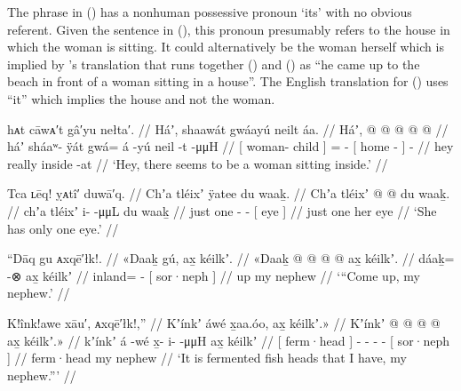 The phrase  in (\lastx) has a nonhuman possessive pronoun  ‘its’ with no obvious referent.
Given the sentence in (\nextx), this pronoun presumably refers to the house in which the woman is sitting.
It could alternatively be the woman herself which is implied by \citeauthor{swanton:1909}’s translation that runs together (\lastx) and (\nextx) as “he came up to the beach in front of a woman sitting in a house”.
The English translation for (\lastx) uses “it” which implies the house and not the woman.

\ex\label{ex:91-250-woman-sitting-inside}%
%
\begingl
	\glpreamble	hᴀt cāwᴀ′t gâ′yu nełta′. //
	\glpreamble	Háʼ, shaawát gwáayú neilt áa. //
	\gla	Háʼ, {}  @ {} {}  @ {} @ {}
		{}  @ {} {}  @ {} //
	\glb	háʼ {} sháaʷ- ÿát {} gwá= á -yú
		{} neil -t {}  -μμH //
	\glc	{} {}[ woman- child {}] =  -
		{}[ home - {}]  - //
	\gld	hey {}  {} {} really\•  {}
		{} inside -at {}  {} //
	\glft	‘Hey, there seems to be a woman sitting inside.’
		//
\endgl
\xe

\ex\label{ex:91-251-only-one-eye}%
%
\begingl
	\glpreamble	Tca ʟēq! ỵᴀtî′ duwā′q. //
	\glpreamble	Chʼa tléixʼ ÿatee du waaḵ. //
	\gla	Chʼa tléixʼ  @ {} @ {}
		{} du waaḵ. {} //
	\glb	chʼa tléixʼ i-  -μμL
		{} du waaḵ {} //
	\glc	just one -  -
		{}[  eye {}] //
	\gld	just one  {} {}
		{} her eye {} //
	\glft	‘She has only one eye.’
		//
\endgl
\xe

\ex\label{ex:91-252-come-up-my-nephew}%
%
\begingl
	\glpreamble	“Dāq gu ᴀxqē′łk!. //
	\glpreamble	«\!Daaḵ gú, ax̱ kéilkʼ. //
	\gla	«\!Daaḵ @  @ {} @ {} @ {}
		{} ax̱ kéilkʼ. {} //
	\glb	\pqp{}dáaḵ= {} {}  -⊗
		{} ax̱ kéilkʼ {} //
	\glc	\pqp{}inland= \· \·  -
		{}[  sor·neph {}] //
	\gld	\pqp{}up  {} {} {}
		{} my nephew {} //
	\glft	‘“Come up, my nephew.’
		//
\endgl
\xe

\ex\label{ex:91-253-I-have-kink}%
%
\begingl
	\glpreamble	K!înk!awe xāu′, ᴀxqē′łk!,” //
	\glpreamble	Kʼínkʼ áwé x̱aa.óo, ax̱ kéilkʼ.\!» //
	\gla	{} Kʼínkʼ {}  @ {}
		 @ {} @ {} @ {}
		{} ax̱ kéilkʼ.\!» {} //
	\glb	{} kʼínkʼ {} á -wé
		x̱- i-  -μμH
		{} ax̱ kéilkʼ {} //
	\glc	{}[ ferm·head {}]  -
		- -  -
		{}[  sor·neph {}] //
	\gld	{} ferm·head {}  {}
		 {} {} {}
		{} my nephew {} //
	\glft	‘It is fermented fish heads that I have, my nephew.”’
		//
\endgl
\xe

